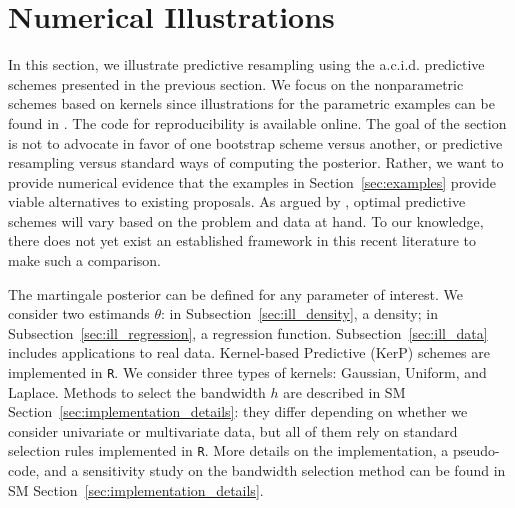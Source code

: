 \documentclass{article}
\theoremstyle{definition}
\renewcommand{\&}{and}
\begin{document}



\section{Numerical Illustrations}\label{sec:simulations}

In this section, we illustrate  predictive resampling using the a.c.i.d. predictive schemes presented in the previous section. %
We focus on the nonparametric schemes based on kernels since illustrations for the parametric examples can be found in \cite{holmes2023statistical,garelli2024asymptotics,fong2024asymptotics}. The code for reproducibility is available online. %
The goal of the section is not to advocate in favor of one bootstrap scheme versus another, or predictive resampling versus standard ways of computing the posterior. %
Rather, we want to provide numerical evidence that the examples in Section~\ref{sec:examples} provide viable alternatives to existing proposals. As argued by \cite{garelli2024asymptotics}, optimal predictive schemes will vary based on the problem and data at hand. To our knowledge, there does not yet exist an established framework in this recent literature to make such a comparison.

The martingale posterior can be defined for any parameter of interest. We consider two estimands $\theta$: in Subsection~\ref{sec:ill_density}, a density; in Subsection~\ref{sec:ill_regression}, a regression function. Subsection~\ref{sec:ill_data} includes applications to real data. Kernel-based Predictive (KerP) schemes are implemented in \texttt{R}. We consider three types of kernels: Gaussian, Uniform, and Laplace. Methods to select the bandwidth $h$ are described in SM Section~\ref{sec:implementation_details}: they differ depending on whether we consider univariate or multivariate data, but all of them rely on standard selection rules implemented in \texttt{R}. More details on the implementation, a pseudo-code, and a sensitivity study on the bandwidth selection method can be found in SM Section~\ref{sec:implementation_details}.%
\end{document}
